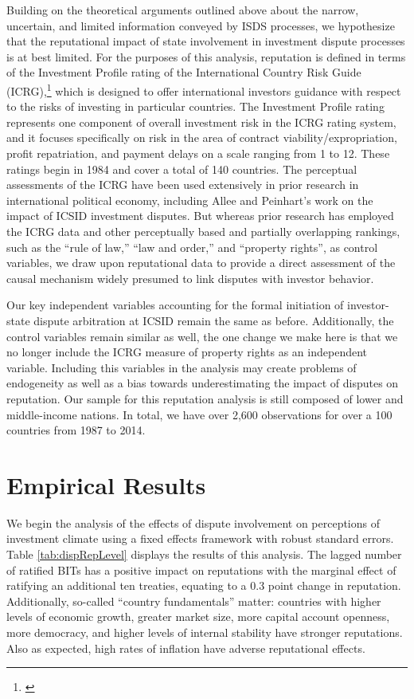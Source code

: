 \documentclass[12pt,onesided]{amsart}
\begin{document}
Building on the theoretical arguments outlined above about the narrow, uncertain, and limited information conveyed by ISDS processes, we hypothesize that the reputational impact of state involvement in investment dispute processes is at best limited. For the purposes of this analysis, reputation is defined in terms of the Investment Profile rating of the International Country Risk Guide (ICRG),\footnote{\citet{prs:2013}} which is designed to offer international investors guidance with respect to the risks of investing in particular countries. The Investment Profile rating represents one component of overall investment risk in the ICRG rating system, and it focuses specifically on risk in the area of contract viability/expropriation, profit repatriation, and payment delays on a scale ranging from 1 to 12. These ratings begin in 1984 and cover a total of 140 countries. The perceptual assessments of the ICRG have been used extensively in prior research in international political economy, including Allee and Peinhart's work on the impact of ICSID investment disputes. But whereas prior research has employed the ICRG data and other perceptually based and partially overlapping rankings, such as the ``rule of law,'' ``law and order,'' and ``property rights'', as control variables, we draw upon reputational data to provide a direct assessment of the causal mechanism widely presumed to link disputes with investor behavior.

Our key independent variables accounting for the formal initiation of investor-state dispute arbitration at ICSID remain the same as before. Additionally, the control variables remain similar as well, the one change we make here is that we no longer include the ICRG measure of property rights as an independent variable. Including this variables in the analysis may create problems of endogeneity as well as a bias towards underestimating the impact of disputes on reputation. Our sample for this reputation analysis is still composed of lower and middle-income nations. In total, we have over 2,600 observations for over a 100 countries from 1987 to 2014.

\section*{Empirical Results}

We begin the analysis of the effects of dispute involvement on perceptions of investment climate using a fixed effects framework with robust standard errors. Table \ref{tab:dispRepLevel} displays the results of this analysis. The lagged number of ratified BITs has a positive impact on reputations with the marginal effect of ratifying an additional ten treaties, equating to a 0.3 point change in reputation. Additionally, so-called ``country fundamentals'' matter: countries with higher levels of economic growth, greater market size, more capital account openness, more democracy, and higher levels of internal stability have stronger reputations. Also as expected, high rates of inflation have adverse reputational effects.
\end{document}
